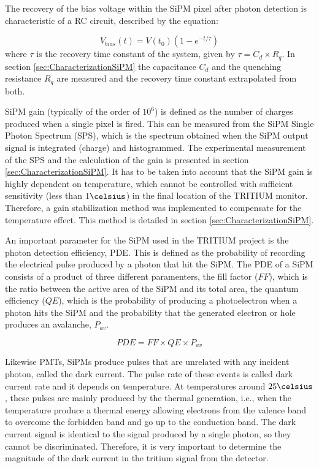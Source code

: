 The recovery of the bias voltage within the SiPM pixel after photon detection is characteristic of a RC circuit, described by the equation: 

\begin{equation}
V_{bias}(t)=V(t_0)\left(1-e^{-t/\tau} \right)
\label{RCCircuitBiasVoltage}
\end{equation}
where $\tau$ is the recovery time constant of the system, given by $\tau=C_d \times R_q$. In section \ref{sec:CharacterizationSiPM} the capacitance $C_d$ and the quenching resistance $R_q$ are measured and the recovery time constant extrapolated from both.

SiPM gain (typically of the order of $10^6$) is defined as the number of charges produced when a single pixel is fired. This can be measured from the SiPM Single Photon Spectrum (SPS), which is the spectrum obtained when the SiPM output signal is integrated (charge) and histogrammed. The experimental measurement of the SPS and the calculation of the gain is presented in section \ref{sec:CharacterizationSiPM}. It has to be taken into account that the SiPM gain is highly dependent on temperature, which cannot be controlled with sufficient sensitivity (less than $1\celsius$) in the final location of the TRITIUM monitor. Therefore, a gain stabilization method was implemented to compensate for the temperature effect. This method is detailed in section \ref{sec:CharacterizationSiPM}.

An important parameter for the SiPM used in the TRITIUM project is the photon detection efficiency, PDE. This is defined as the probability of recording the electrical pulse produced by a photon that hit the SiPM. The PDE of a SiPM consists of a product of three different paramenters, the fill factor ($FF$), which is the ratio between the active area of the SiPM and its total area, the quantum efficiency ($QE$), which is the probability of producing a photoelectron when a photon hits the SiPM and the probability that the generated electron or hole produces an avalanche, $P_{av}$.

\begin{equation}
PDE=FF \times QE \times P_{av}
\label{PDE_SiPM}
\end{equation}

Likewise PMTs, SiPMs produce pulses that are unrelated with any incident photon, called the dark current. The pulse rate of these events is called dark current rate and it depends on temperature. At temperatures around $25\celsius$, these pulses are mainly produced by the thermal generation, i.e., when the temperature produce a thermal energy allowing electrons from the valence band to overcome the forbidden band and go up to the conduction band. The dark current signal is identical to the signal produced by a single photon, so they cannot be discriminated. Therefore, it is very important to determine the magnitude of the dark current in the tritium signal from the detector.


